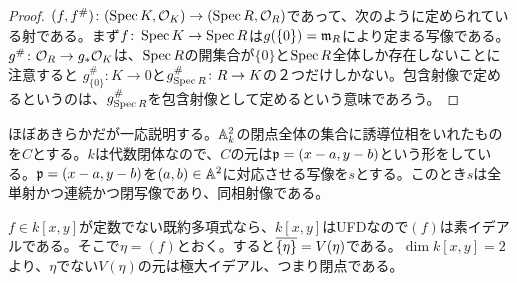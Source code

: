 \begin{proof}
  $(f,f^{\#}) \colon (\operatorname{Spec} K, \mathcal{O}_K) \to (\operatorname{Spec} R, \mathcal{O}_R)$であって、次のように定められている射である。まず$f \colon \operatorname{Spec} K \to \operatorname{Spec} R$は$g(\{ 0 \} ) = \mathfrak{m}_R$により定まる写像である。$g^{\# } \colon \mathcal{O}_R \to g_* \mathcal{O}_K$は、$\operatorname{Spec} R$の開集合が$\{0\}$と$\operatorname{Spec} R$全体しか存在しないことに注意すると
  $g_{ \{0\} }^{\#} \colon K \to 0$と$g^{\#}_{\operatorname{Spec} R} \colon R \to K$の２つだけしかない。包含射像で定めるというのは、$g^{\#}_{\operatorname{Spec} R}$を包含射像として定めるという意味であろう。
\end{proof}



\begin{rem}
  ほぼあきらかだが一応説明する。${\mathbb A}_k^2$の閉点全体の集合に誘導位相をいれたものを$C$とする。$k$は代数閉体なので、$C$の元は$\mathfrak{p} = (x-a,y-b)$という形をしている。$\mathfrak{p} = (x-a,y-b)$を$(a,b) \in {\mathbb A}^2$に対応させる写像を$s$とする。このとき$s$は全単射かつ連続かつ閉写像であり、同相射像である。
\end{rem}



\begin{rem}
  $f \in k[x,y]$が定数でない既約多項式なら、$k[x,y]$はUFDなので$(f)$は素イデアルである。そこで$\eta = (f)$とおく。すると$\overline{\{ \eta \} } = V(\eta)$である。$\dim k[x,y] =2$より、$\eta$でない$V(\eta)$の元は極大イデアル、つまり閉点である。
\end{rem}

